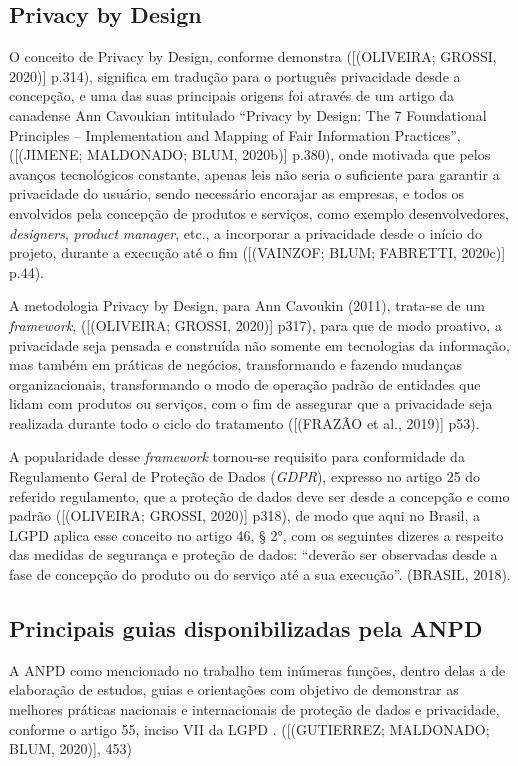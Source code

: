 \documentclass[
	12pt,				%
	openright,			%
	oneside,			%
	a4paper,			%
	english,			%
	french,				%
	spanish,			%
	brazil,				%
	]{abntex2}
\begin{document}
\subsection{ Privacy by Design  }

O conceito de Privacy by Design, conforme demonstra ([(OLIVEIRA; GROSSI, 2020)] p.314),  significa em tradução para o português privacidade desde a concepção, e uma das suas principais origens foi através de um artigo da canadense Ann Cavoukian intitulado “Privacy by Design: The 7 Foundational Principles – Implementation and Mapping of Fair Information Practices”, ([(JIMENE; MALDONADO; BLUM, 2020b)] p.380), onde motivada que pelos avanços tecnológicos constante, apenas leis não seria o suficiente para garantir a privacidade do usuário, sendo necessário encorajar as empresas, e todos os envolvidos pela concepção de produtos e serviços, como exemplo desenvolvedores, \textit{designers}, \textit{product} \textit{manager}, etc., a incorporar a privacidade desde o início do projeto, durante a execução até o fim ([(VAINZOF; BLUM; FABRETTI, 2020c)] p.44). 

A metodologia Privacy by Design, para Ann Cavoukin (2011), trata-se de um \textit{framework}, ([(OLIVEIRA; GROSSI, 2020)] p317),  para que de modo proativo, a privacidade seja pensada e construída não somente em tecnologias da informação, mas também em práticas de negócios, transformando e fazendo mudanças organizacionais, transformando o modo de operação padrão de entidades que lidam com produtos ou serviços, com o fim de assegurar que a privacidade seja realizada durante todo o ciclo do tratamento ([(FRAZÃO et al., 2019)] p53).

A popularidade desse \textit{framework} tornou-se requisito para conformidade da Regulamento Geral de Proteção de Dados (\textit{GDPR}), expresso no artigo 25 do referido  regulamento, que a proteção de dados deve ser desde a concepção e como padrão ([(OLIVEIRA; GROSSI, 2020)] p318), de modo que aqui no Brasil, a LGPD aplica esse conceito no artigo 46, § 2°, com os seguintes dizeres a respeito das medidas de segurança e proteção de dados: “deverão ser observadas desde a fase de concepção do produto ou do serviço até a sua execução”. (BRASIL, 2018).

\subsection{ Principais guias disponibilizadas pela ANPD  }

A ANPD como mencionado no trabalho tem inúmeras funções, dentro delas a de elaboração de estudos, guias e orientações com objetivo de demonstrar as melhores práticas nacionais e internacionais de proteção de dados e privacidade, conforme o artigo 55, inciso VII da LGPD . ([(GUTIERREZ; MALDONADO; BLUM, 2020)], 453)
\end{document}
